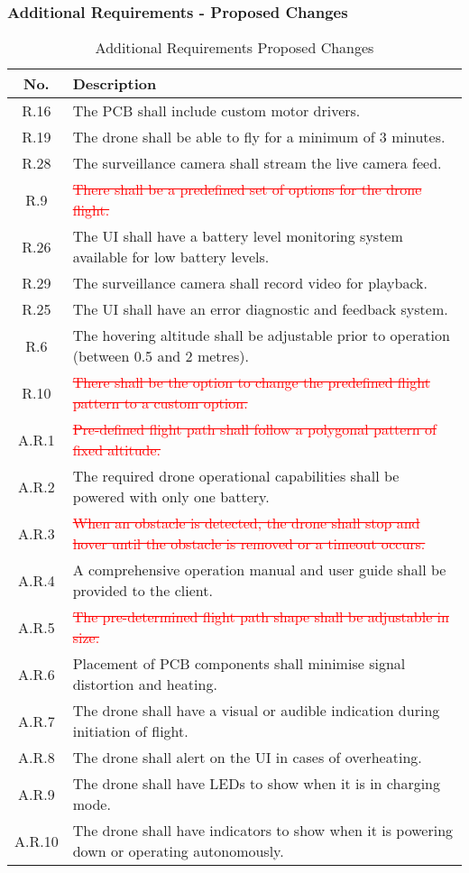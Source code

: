 \subsubsection{Additional Requirements - Proposed Changes}

\begin{table}[H]
\centering
\caption{Additional Requirements Proposed Changes}
\begin{tabular}{|c|p{11cm}|}
\hline
\textbf{No.} & \textbf{Description} \\ \hline
R.16 & The PCB shall include custom motor drivers. \\ \hline
R.19 & The drone shall be able to fly for a minimum of 3 minutes. \\ \hline
R.28 & The surveillance camera shall stream the live camera feed. \\ \hline
R.9 & \textcolor{red}{\sout{There shall be a predefined set of options for the drone flight.}} \\ \hline
R.26 & The UI shall have a battery level monitoring system available for low battery levels. \\ \hline
R.29 & The surveillance camera shall record video for playback. \\ \hline
R.25 & The UI shall have an error diagnostic and feedback system. \\ \hline
R.6 & The hovering altitude shall be adjustable prior to operation (between 0.5 and 2 metres). \\ \hline
R.10 & \textcolor{red}{\sout{There shall be the option to change the predefined flight pattern to a custom option.}} \\ \hline
A.R.1 & \textcolor{red}{\sout{Pre-defined flight path shall follow a polygonal pattern of fixed altitude.}} \\ \hline
A.R.2 & The required drone operational capabilities shall be powered with only one battery. \\ \hline
A.R.3 & \textcolor{red}{\sout{When an obstacle is detected, the drone shall stop and hover until the obstacle is removed or a timeout occurs.}} \\ \hline
A.R.4 & A comprehensive operation manual and user guide shall be provided to the client. \\ \hline
A.R.5 & \textcolor{red}{\sout{The pre-determined flight path shape shall be adjustable in size.}} \\ \hline
A.R.6 & Placement of PCB components shall minimise signal distortion and heating. \\ \hline
A.R.7 & The drone shall have a visual or audible indication during initiation of flight. \\ \hline
A.R.8 & The drone shall alert on the UI in cases of overheating. \\ \hline
A.R.9 & The drone shall have LEDs to show when it is in charging mode. \\ \hline
A.R.10 & The drone shall have indicators to show when it is powering down or operating autonomously. \\ \hline
\end{tabular}
\end{table}

